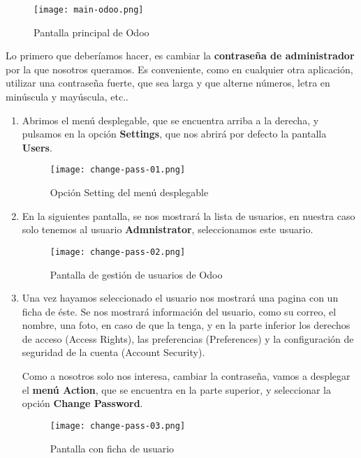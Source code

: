 \begin{figure}[ht]
    \centering
    \texttt{[image: main-odoo.png]}
    \caption{Pantalla principal de Odoo}
\end{figure}

Lo primero que deberíamos hacer, es cambiar la \textbf{contraseña de administrador} por la que nosotros queramos. Es conveniente, como en cualquier otra aplicación, utilizar una contraseña fuerte, que sea larga y que alterne números, letra en minúscula y mayúscula, etc..

\begin{enumerate}
    \item Abrimos el menú desplegable, que se encuentra arriba a la derecha, y pulsamos en la opción \textbf{Settings}, que nos abrirá por defecto la pantalla \textbf{Users}.

    \begin{figure}[ht]
        \centering
        \texttt{[image: change-pass-01.png]}
        \caption{Opción Setting del menú desplegable}
    \end{figure}

    \item En la siguientes pantalla, se nos mostrará la lista de usuarios, en nuestra caso solo tenemos al usuario \textbf{Admnistrator}, seleccionamos este usuario.

    \begin{figure}[ht]
        \centering
        \texttt{[image: change-pass-02.png]}
        \caption{Pantalla de gestión de usuarios de Odoo}
    \end{figure}

    \item Una vez hayamos seleccionado el usuario nos mostrará una pagina con un ficha de éste. Se nos mostrará información del usuario, como su correo, el nombre, una foto, en caso de que la tenga, y en la parte inferior los derechos de acceso (Access Rights), las preferencias (Preferences) y la configuración de seguridad de la cuenta (Account Security).

    Como a nosotros solo nos interesa, cambiar la contraseña, vamos a desplegar el \textbf{menú Action}, que se encuentra en la parte superior, y seleccionar la opción \textbf{Change Password}.

    \vspace{8ex}

    \begin{figure}[ht]
        \centering
        \texttt{[image: change-pass-03.png]}
        \caption{Pantalla con ficha de usuario}
        \label{fig:user}
    \end{figure}


\end{enumerate}
